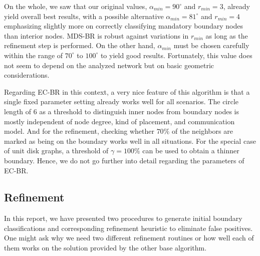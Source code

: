 \documentclass{llncs}
\begin{document}
On the whole, we saw that our original values, $\alpha_{min}=90^\circ$ and $r_{min} = 3$, already yield overall best results, with a possible alternative $\alpha_{min}=81^\circ$ and $r_{min} = 4$ emphasizing slightly more on correctly classifying mandatory boundary nodes than interior nodes.
MDS-BR is robust against variations in $r_{min}$ as long as the refinement step is performed.
On the other hand, $\alpha_{min}$ must be chosen carefully within the range of $70^\circ$ to $100^\circ$ to yield good results.
Fortunately, this value does not seem to depend on the analyzed network but on basic geometric considerations.

Regarding EC-BR in this context, a very nice feature of this algorithm is that a single fixed parameter setting already works well for all scenarios. The circle length of $6$ as a threshold to distinguish inner nodes from boundary nodes is mostly independent of node degree, kind of placement, and communication model. And for the refinement, checking whether $70\%$ of the neighbors are marked as being on the boundary works well in all situations. For the special case of unit disk graphs, a threshold of $\gamma=100\%$ can be used to obtain a thinner boundary. Hence, we do not go further into detail regarding the parameters of EC-BR.


\subsection{Refinement}
\label{sec::sim::refinement}
In this report, we have presented two procedures to generate initial boundary classifications and corresponding refinement heuristic to eliminate false positives.
One might ask why we need two different refinement routines or how well each of them works on the solution provided by the other base algorithm.
\end{document}
